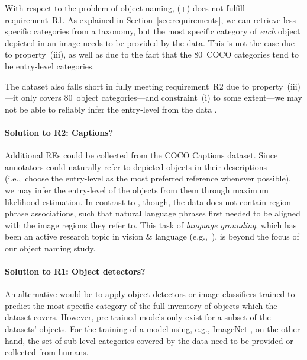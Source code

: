 {%

With respect to the problem of object naming, (+) does not fulfill requirement~R1. 
As explained in Section~\ref{sec:requirements}, we can retrieve less specific categories from a taxonomy, but the most specific category of \textit{each} object depicted in an image needs to be provided by the data. 
This is not the case due to property~(iii), as well as due to the fact that the $80$~COCO categories tend to be entry-level categories. 
%

The dataset also falls short in fully meeting requirement~R2 due to property~(iii)---it only covers 80~object categories---and constraint~(i) to some extent---we may not be able to reliably infer the entry-level from the data . 

\paragraph{Solution to R2: Captions?}
Additional REs could be collected from the COCO Captions dataset. %
Since annotators could naturally refer to depicted objects in their descriptions (i.e.,~choose the entry-level as the most preferred reference whenever possible), we may infer the entry-level of the objects from them through maximum likelihood estimation. 
%
In contrast to \flickr, though, the data does not contain region-phrase associations,  %
such that natural language phrases first needed to be aligned with the image regions they refer to. 
This task of \textit{language grounding}, which has been an active research topic in vision \& language (e.g.,~\cite{kong2014what,karpathy2015deep,rohrbach2016grounding}), is beyond the focus of our object naming study. 

\paragraph{Solution to R1: Object detectors?}
An alternative would be to apply object detectors or image classifiers trained to predict the most specific category of the full inventory of objects which the dataset covers. 
However, pre-trained models only exist for a subset of the datasets' objects. 
For the training of a model using, e.g., ImageNet \cite{imagenet_cvpr09}, on the other hand, the  set of sub-level categories covered by the data need to be provided or collected from humans. 

}
